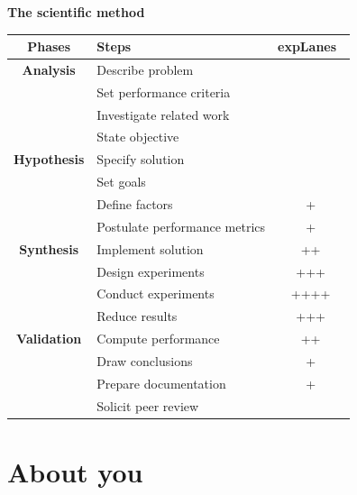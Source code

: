 \documentclass[a4paper,fleqn]{tufte-handout}
\newcommand{\explanes}{\textsf{expLanes}\ }
\begin{document}
\begin{center} \bf The scientific method\cite{right} \end{center}
\begin{tabular}{clc}
\bf Phases & Steps  & \explanes \\
\hline
\bf Analysis & Describe problem & \\
& Set performance criteria & \\
& Investigate related work & \\
& State objective & \\
\bf Hypothesis & Specify solution & \\
& Set goals & \\
& Define factors & + \\
& Postulate performance metrics & + \\
\bf Synthesis & Implement solution & ++ \\
& Design experiments & +++ \\
& Conduct experiments & ++++ \\
& Reduce results & +++ \\
\bf Validation & Compute performance & ++ \\
& Draw conclusions & +\\
& Prepare documentation & + \\
& Solicit peer review & \\
\end{tabular}


\section{About you}
\hypertarget{you}{} 
\end{document}
